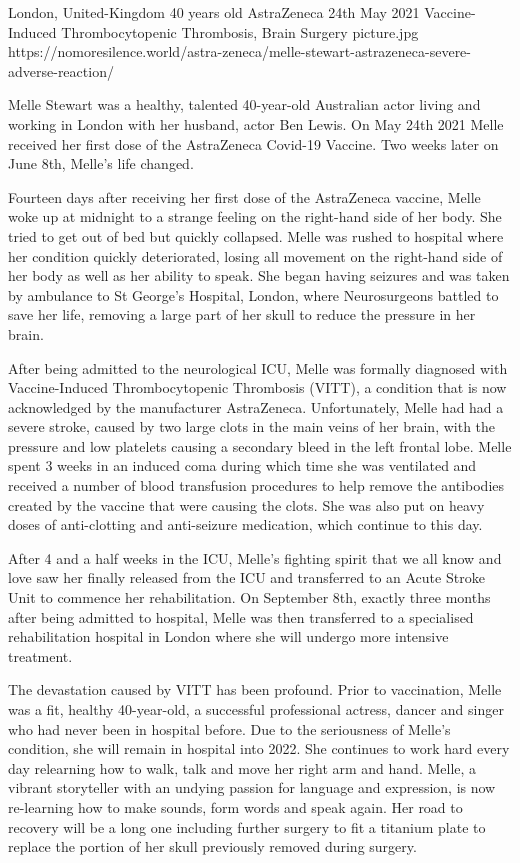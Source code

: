 {London, United-Kingdom}
{40 years old}
{AstraZeneca }
{24th May 2021}
{Vaccine-Induced Thrombocytopenic Thrombosis, Brain Surgery}
{picture.jpg}
{https://nomoresilence.world/astra-zeneca/melle-stewart-astrazeneca-severe-adverse-reaction/}
{

Melle Stewart was a healthy, talented 40-year-old Australian actor living and
working in London with her husband, actor Ben Lewis. On May 24th 2021 Melle
received her first dose of the AstraZeneca Covid-19 Vaccine. Two weeks later on
June 8th, Melle’s life changed.

Fourteen days after receiving her first dose of the AstraZeneca vaccine, Melle
woke up at midnight to a strange feeling on the right-hand side of her body. She
tried to get out of bed but quickly collapsed. Melle was rushed to hospital
where her condition quickly deteriorated, losing all movement on the right-hand
side of her body as well as her ability to speak. She began having seizures and
was taken by ambulance to St George’s Hospital, London, where Neurosurgeons
battled to save her life, removing a large part of her skull to reduce the
pressure in her brain.

After being admitted to the neurological ICU, Melle was formally diagnosed with
Vaccine-Induced Thrombocytopenic Thrombosis (VITT), a condition that is now
acknowledged by the manufacturer AstraZeneca. Unfortunately, Melle had had a
severe stroke, caused by two large clots in the main veins of her brain, with
the pressure and low platelets causing a secondary bleed in the left frontal
lobe. Melle spent 3 weeks in an induced coma during which time she was
ventilated and received a number of blood transfusion procedures to help remove
the antibodies created by the vaccine that were causing the clots. She was also
put on heavy doses of anti-clotting and anti-seizure medication, which continue
to this day.

After 4 and a half weeks in the ICU, Melle’s fighting spirit that we all know
and love saw her finally released from the ICU and transferred to an Acute
Stroke Unit to commence her rehabilitation. On September 8th, exactly three
months after being admitted to hospital, Melle was then transferred to a
specialised rehabilitation hospital in London where she will undergo more
intensive treatment.

The devastation caused by VITT has been profound. Prior to vaccination, Melle
was a fit, healthy 40-year-old, a successful professional actress, dancer and
singer who had never been in hospital before. Due to the seriousness of Melle’s
condition, she will remain in hospital into 2022. She continues to work hard
every day relearning how to walk, talk and move her right arm and hand. Melle, a
vibrant storyteller with an undying passion for language and expression, is now
re-learning how to make sounds, form words and speak again. Her road to recovery
will be a long one including further surgery to fit a titanium plate to replace
the portion of her skull previously removed during surgery.

}
